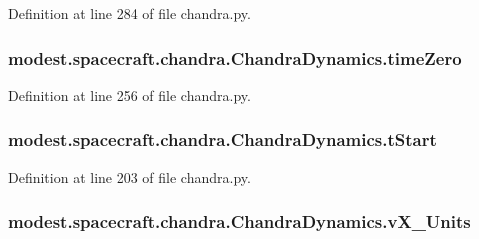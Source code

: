 Definition at line 284 of file chandra.\+py.

\subsubsection[{\texorpdfstring{time\+Zero}{timeZero}}]{\setlength{\rightskip}{0pt plus 5cm}modest.\+spacecraft.\+chandra.\+Chandra\+Dynamics.\+time\+Zero}\hypertarget{classmodest_1_1spacecraft_1_1chandra_1_1ChandraDynamics_a5b17d067013c58c5828c4ca357ba47d6}{}\label{classmodest_1_1spacecraft_1_1chandra_1_1ChandraDynamics_a5b17d067013c58c5828c4ca357ba47d6}


Definition at line 256 of file chandra.\+py.

\subsubsection[{\texorpdfstring{t\+Start}{tStart}}]{\setlength{\rightskip}{0pt plus 5cm}modest.\+spacecraft.\+chandra.\+Chandra\+Dynamics.\+t\+Start}\hypertarget{classmodest_1_1spacecraft_1_1chandra_1_1ChandraDynamics_a9452eb26e394075494e1f5c3a621c87c}{}\label{classmodest_1_1spacecraft_1_1chandra_1_1ChandraDynamics_a9452eb26e394075494e1f5c3a621c87c}


Definition at line 203 of file chandra.\+py.

\subsubsection[{\texorpdfstring{v\+X\+\_\+\+Units}{vX_Units}}]{\setlength{\rightskip}{0pt plus 5cm}modest.\+spacecraft.\+chandra.\+Chandra\+Dynamics.\+v\+X\+\_\+\+Units}\hypertarget{classmodest_1_1spacecraft_1_1chandra_1_1ChandraDynamics_a982c52e3ea9eac5de2611e2d7ca107b3}{}\label{classmodest_1_1spacecraft_1_1chandra_1_1ChandraDynamics_a982c52e3ea9eac5de2611e2d7ca107b3}



